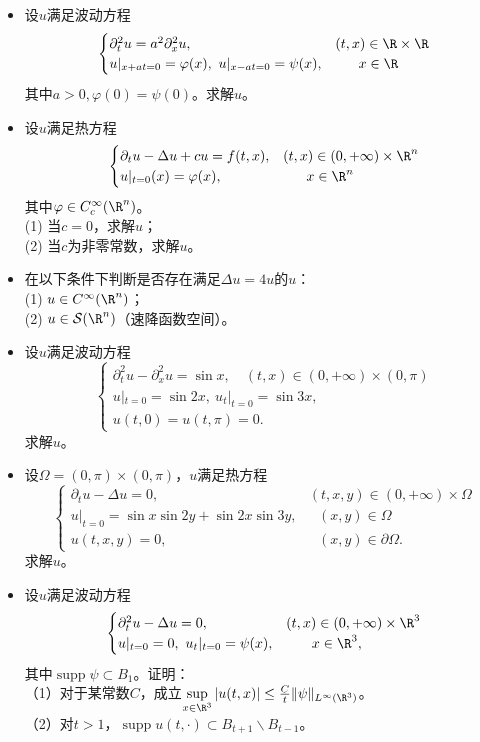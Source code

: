 \begin{itemize}
    \item[1.] 设$u$满足波动方程
    \[\begin{cases}\partial_t^2u=a^2\partial_x^2u,&(t,x)\in\R\times\R\\
      u|_{x+at=0}=\varphi(x),\ u|_{x-at=0}=\psi(x),&\quad\,\,\ x\in\R
    \end{cases}\]
    其中$a>0,\varphi(0)=\psi(0)$。求解$u$。

    \item[2.] 设$u$满足热方程
    \[\begin{cases}
    \partial_tu-\Delta u+cu=f(t,x),&(t,x)\in(0,+\infty)\times\R^n\\
    u|_{t=0}(x)=\varphi(x),&\quad\ \ x\in\R^n
    \end{cases}\]
    其中$\varphi\in C_c^\infty(\R^n)$。\\
    (1) 当$c=0$，求解$u$；\\
    (2) 当$c$为非零常数，求解$u$。

    \item[3.] 在以下条件下判断是否存在满足$\Delta u=4u$的$u$：\\
    (1) $u\in C^\infty(\R^n)$；\\
    (2) $u\in \mathcal{S}(\R^n)$（速降函数空间）。
    
    \item[4.] 设$u$满足波动方程
    \[\begin{cases}
        \partial_t^2u-\partial_x^2u=\sin x,\quad (t,x)\in(0,+\infty)\times(0,\pi)\\
        u|_{t=0}=\sin2x,\ u_t|_{t=0}=\sin3x,\\
        u(t,0)=u(t,\pi)=0.
    \end{cases}\]
    求解$u$。

    \item[5.] 设$\Omega=(0,\pi)\times(0,\pi)$，$u$满足热方程
    $$\begin{cases}
        \partial_tu-\Delta u=0,&(t,x,y)\in(0,+\infty)\times\Omega\\
        u|_{t=0}=\sin x\sin2y+\sin2x\sin3y,&\ \ \ (x,y)\in\Omega\\
        u(t,x,y)=0,&\ \ \ (x,y)\in\partial\Omega.
    \end{cases}$$
    求解$u$。

    \item[6.] 设$u$满足波动方程
    \[\begin{cases}
        \partial_t^2u-\Delta u=0,&(t,x)\in(0,+\infty)\times\R^3\\
        u|_{t=0}=0,\ u_t|_{t=0}=\psi(x),&\quad\ \ \,x\in\R^3,
    \end{cases}\]
    其中$\operatorname{supp}\psi\subset B_1$。证明：\\
    （1）对于某常数$C$，成立$\sup\limits_{x\in\R^3}|u(t,x)|
    \le\frac{C}{t}\|\psi\|_{L^\infty(\R^3)}$。\\
    （2）对$t>1$，$\operatorname{supp}u(t,\cdot)\subset B_{t+1}\backslash B_{t-1}$。


\end{itemize}
